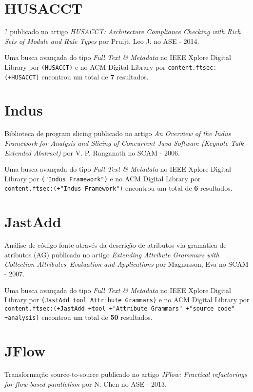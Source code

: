 \section{HUSACCT}

?
publicado no artigo
{\it HUSACCT: Architecture Compliance Checking with Rich Sets of Module and Rule Types}
por
Pruijt, Leo J.
no
ASE
-
2014.


Uma busca avançada do tipo {\it Full Text \& Metadata} no IEEE Xplore Digital Library por
\texttt{(HUSACCT)}
e no ACM Digital Library por
\texttt{content.ftsec:(+HUSACCT)}
encontrou um total de
{\bf 7}
resultados.

\section{Indus}

Biblioteca de program slicing
publicado no artigo
{\it An Overview of the Indus Framework for Analysis and Slicing of Concurrent Java Software (Keynote Talk - Extended Abstract)}
por
V. P. Ranganath
no
SCAM
-
2006.


Uma busca avançada do tipo {\it Full Text \& Metadata} no IEEE Xplore Digital Library por
\texttt{("Indus Framework")}
e no ACM Digital Library por
\texttt{content.ftsec:(+"Indus Framework")}
encontrou um total de
{\bf 6}
resultados.

\section{JastAdd}

Análise de código-fonte através da descrição de atributos via gramática de atributos (AG)
publicado no artigo
{\it Extending Attribute Grammars with Collection Attributes--Evaluation and Applications}
por
Magnusson, Eva
no
SCAM
-
2007.


Uma busca avançada do tipo {\it Full Text \& Metadata} no IEEE Xplore Digital Library por
\texttt{(JastAdd tool Attribute Grammars)}
e no ACM Digital Library por
\texttt{content.ftsec:(+JastAdd +tool +"Attribute Grammars" +"source code" +analysis)}
encontrou um total de
{\bf 50}
resultados.

\section{JFlow}

Transformação source-to-source
publicado no artigo
{\it JFlow: Practical refactorings for flow-based parallelism}
por
N. Chen
no
ASE
-
2013.


